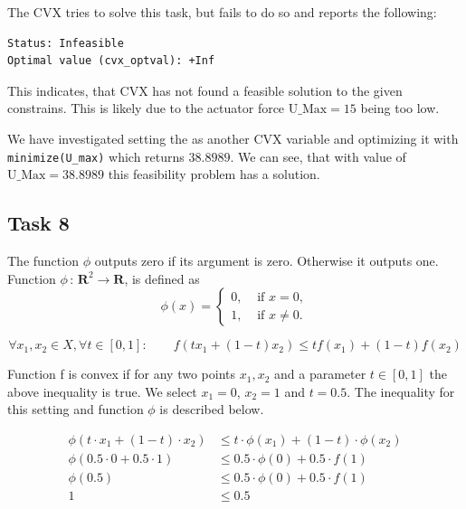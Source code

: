 The CVX tries to solve this task, but fails to do so and reports the following:
\begin{lstlisting}
Status: Infeasible
Optimal value (cvx_optval): +Inf
\end{lstlisting}

This indicates, that CVX has not found a feasible solution to the given constrains. This is likely due to the actuator force $\text{U\_Max}=15$ being too low. 

We have investigated setting the  as another CVX variable and optimizing it with \lstinline{minimize(U_max)} which returns $38.8989$. We can see, that with value of $\text{U\_Max}=38.8989$ this feasibility problem has a solution.


\clearpage
\subsection{Task 8}
The function $\phi$ outputs zero if its argument is zero. Otherwise it outputs one. Function $\phi\,:\,{\mathbf R}^2 \rightarrow {\mathbf R}$, is defined as $$\phi(x) = \left\{ \begin{array}{ll} 0,  & \text{ if } x = 0, \\ 1, & \text{ if }x \neq 0. \end{array} \right.$$


\begin{equation}
	\forall x_1, x_2 \in X, \forall t \in [0, 1]: \qquad f(tx_1+(1-t)x_2)\leq t f(x_1)+(1-t)f(x_2)
\end{equation}

Function f is convex if for any two points $x_{1}, x_{2}$ and a parameter $t\in[0, 1]$ the above inequality is true. We select $x_{1} = 0$, $x_{2} = 1$ and $t=0.5$. The inequality for this setting and function $\phi$ is described below.

\begin{equation}
\begin{split}
	\phi(t \cdot x_1+(1-t) \cdot x_2) &\leq t \cdot \phi(x_1)+(1-t) \cdot \phi(x_2)\\
	\phi(0.5 \cdot 0 + 0.5 \cdot 1) &\leq 0.5 \cdot \phi(0) + 0.5 \cdot f(1)\\
	\phi(0.5) &\leq 0.5 \cdot \phi(0) + 0.5 \cdot f(1)\\
	1 &\leq 0.5
\end{split}
\end{equation}

